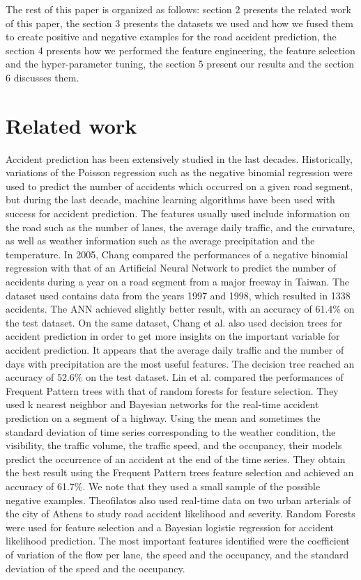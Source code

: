 \documentclass[conference]{IEEEtran}
\begin{document}
The rest of this paper is organized as follows: section 2 presents the related work of this paper, the section 3 presents the datasets we used and how we fused them to create positive and negative examples for the road accident prediction, the section 4 presents how we performed the feature engineering, the feature selection and the hyper-parameter tuning, the section 5 present our results and the section 6 discusses them.

\section{Related work}
Accident prediction has been extensively studied in the last decades.
Historically, variations of the Poisson regression such as the negative binomial regression were used to predict the number of accidents which occurred on a given road segment, but during the last decade, machine learning algorithms have been used with success for accident prediction.
The features usually used include information on the road such as the number of lanes, the average daily traffic, and the curvature, as well as weather information such as the average precipitation and the temperature.
In 2005, Chang \cite{Chang2005} compared the performances of a negative binomial regression with that of an Artificial Neural Network to predict the number of accidents during a year on a road segment from a major freeway in Taiwan.
The dataset used contains data from the years 1997 and 1998, which resulted in 1338 accidents.
The ANN achieved slightly better result, with an accuracy of 61.4\% on the test dataset.
On the same dataset, Chang et al.\cite{Chang2005b} also used decision trees for accident prediction in order to get more insights on the important variable for accident prediction.
It appears that the average daily traffic and the number of days with precipitation are the most useful features.
The decision tree reached an accuracy of 52.6\% on the test dataset.
Lin et al.
\cite{Lin2015} compared the performances of Frequent Pattern trees with that of random forests for feature selection.
They used k nearest neighbor and Bayesian networks for the real-time accident prediction on a segment of a highway.
Using the mean and sometimes the standard deviation of time series corresponding to the weather condition, the visibility, the traffic volume, the traffic speed, and the occupancy, their models predict the occurrence of an accident at the end of the time series.
They obtain the best result using the Frequent Pattern trees feature selection and achieved an accuracy of 61.7\%.
We note that they used a small sample of the possible negative examples.
Theofilatos\cite{Theofilatos2017} also used real-time data on two urban arterials of the city of Athens to study road accident likelihood and severity.
Random Forests were used for feature selection and a Bayesian logistic regression for accident likelihood prediction.
The most important features identified were the coefficient of variation of the flow per lane, the speed and the occupancy, and the standard deviation of the speed and the occupancy.
\end{document}
